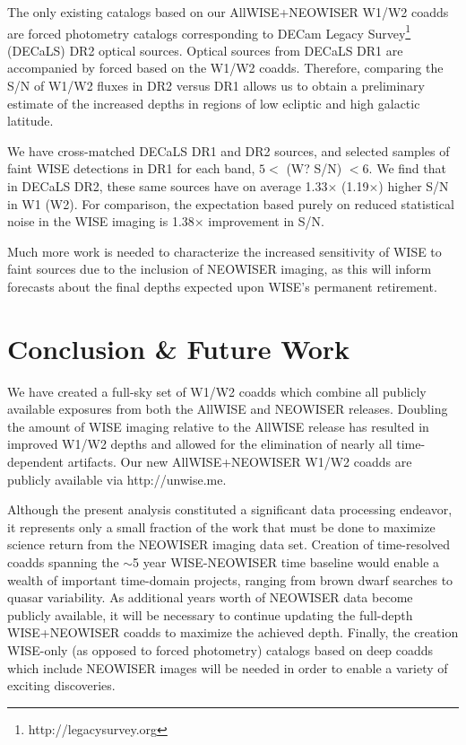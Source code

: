 \documentclass{emulateapj}
\begin{document}
The only existing catalogs based on our AllWISE+NEOWISER W1/W2 coadds
are forced photometry catalogs corresponding to DECam Legacy
Survey\footnote{http://legacysurvey.org} (DECaLS) DR2 optical sources. 
Optical sources from DECaLS DR1 are accompanied by forced based on the
\cite{lang14} W1/W2 coadds. Therefore, comparing the S/N of W1/W2
fluxes in DR2 versus DR1 allows us to obtain a preliminary estimate of the 
increased depths in regions of low ecliptic and high galactic latitude.

We have cross-matched DECaLS DR1 and DR2 sources, and selected samples of
faint WISE detections in DR1 for each band, $5<$ (W? S/N) $<6$. We find that
in DECaLS DR2, these same sources have on average 1.33$\times$ (1.19$\times$)
higher S/N in W1 (W2). For comparison, the expectation based purely on
reduced statistical noise in the WISE imaging is 1.38$\times$ improvement in
S/N.

Much more work is needed to characterize the increased sensitivity
of WISE to faint sources due to the inclusion of NEOWISER
imaging, as this will inform forecasts about the final depths expected
upon WISE's permanent retirement.

\section{Conclusion \& Future Work}
\label{sec:future}

We have created a full-sky set of W1/W2 coadds which combine all publicly
available exposures from both the AllWISE and NEOWISER releases. Doubling the 
amount of WISE imaging relative to the AllWISE release has resulted in improved
W1/W2 depths and allowed for the elimination of nearly all time-dependent 
artifacts. Our new AllWISE+NEOWISER W1/W2 coadds are publicly available
via http://unwise.me.

Although the present analysis constituted a significant data processing 
endeavor, it represents only a small fraction of the work that must
be done to maximize science return from the NEOWISER imaging data set.
Creation of time-resolved coadds spanning the $\sim$5 year WISE-NEOWISER
time baseline would enable a wealth of important time-domain projects,
ranging from brown dwarf searches to quasar variability. As
additional years worth of NEOWISER data become publicly available, it
will be necessary to continue updating the full-depth WISE+NEOWISER coadds
to maximize the achieved depth. Finally, the creation WISE-only (as opposed
to forced photometry) catalogs based on deep coadds which include
NEOWISER images will be needed in order to enable a variety of exciting
discoveries.
\end{document}
